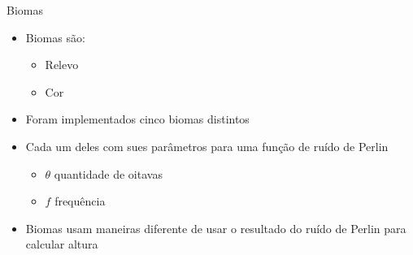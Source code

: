 \begin{frame}{Biomas}
    \begin{itemize} \setlength\itemsep{1em}
        \item Biomas são:
        \begin{itemize}
            \item Relevo
            \item Cor
        \end{itemize}
        \item Foram implementados cinco biomas distintos
        \item Cada um deles com sues parâmetros para uma função de ruído de Perlin
        \begin{itemize}
            \item $\theta$ quantidade de oitavas
            \item $f$ frequência
        \end{itemize}
        \item Biomas usam maneiras diferente de usar o resultado
        do ruído de Perlin para calcular altura
    \end{itemize}
    
    
    
\end{frame}

